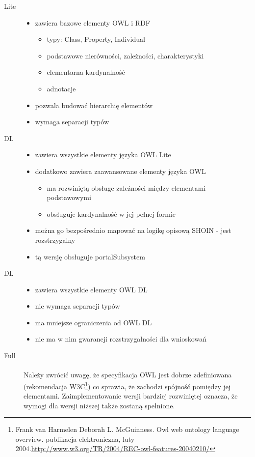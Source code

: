 \begin{description}
 \item[Lite]
 \begin{itemize}
	 \item zawiera bazowe elementy OWL i RDF
		\begin{itemize}
 		\item typy: Class, Property, Individual
		\item podstawowe nierówności, zależności, charakterystyki
		\item elementarna kardynalność
		\item adnotacje
		\end{itemize}
	\item pozwala budować hierarchię elementów
	\item wymaga separacji typów
	\end{itemize}
\item[DL]
\begin{itemize}
	\item zawiera wszystkie elementy języka OWL Lite
	\item dodatkowo zawiera zaawansowane elementy języka OWL
		\begin{itemize}
 		\item ma rozwiniętą obsługe zależności między elementami podstawowymi
		\item obsługuje kardynalność w jej pełnej formie
		\end{itemize}
	\item można go bezpośrednio mapować na logikę opisową SHOIN - jest rozstrzygalny
	\item tą wersję obsługuje portalSubsystem
	\end{itemize}
\item[DL]
\begin{itemize}
	\item zawiera wszystkie elementy OWL DL
	\item nie wymaga separacji typów
	\item ma mniejsze ograniczenia od OWL DL
	\item nie ma w nim gwarancji rozstrzygalności dla wnioskowań
	\end{itemize}
\item[Full]

\paragraph{} Należy zwrócić uwagę, że specyfikacja OWL jest dobrze zdefiniowana (rekomendacja W3C\footnote{Frank van Harmelen Deborah L. McGuinness. Owl web ontology language overview. publikacja elektroniczna, luty 2004.\url{http://www.w3.org/TR/2004/REC-owl-features-20040210/}
}) co sprawia, że zachodzi spójność pomiędzy jej elementami. Zaimplementowanie wersji bardziej rozwiniętej oznacza, że wymogi dla wersji niższej także zostaną spełnione.
\end{description}


